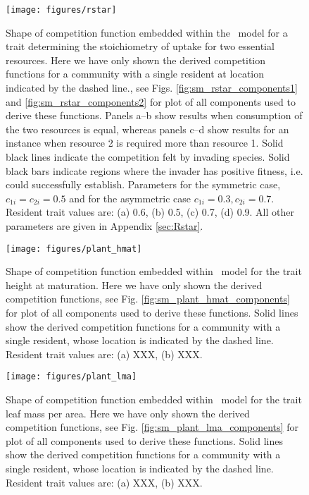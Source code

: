 \documentclass[a4paper,11pt]{article}
\begin{document}
\begin{figure}[h]
  \centering
  \texttt{[image: figures/rstar]}
  \caption{Shape of competition function embedded within the \Rstar\ model
  for a trait determining the stoichiometry of uptake for two essential resources.
  Here we have only shown the derived  competition functions for a
  community with a single resident at location indicated by the dashed line., see Figs.
  \ref{fig:sm_rstar_components1} and \ref{fig:sm_rstar_components2} for plot of all
  components used to derive these functions.
  Panels a--b show results when consumption of the two resources is equal, whereas
  panels c--d show results for an instance when resource 2 is required more than
  resource 1.
  Solid black lines indicate the competition felt by invading species. Solid
  black bars indicate regions where the invader has positive fitness, i.e.
  could successfully establish. Parameters for the symmetric case, $c_{1i} =
  c_ {2i}=0.5$ and for the asymmetric case $c_{1i} = 0.3, c_ {2i}=0.7$. Resident
  trait values are: (a) 0.6, (b) 0.5, (c) 0.7, (d) 0.9. All other parameters
  are given in Appendix \ref{sec:Rstar}.}
  \label{fig:Rstar}
\end{figure}

\begin{figure}[h]
  \centering
  \texttt{[image: figures/plant\_hmat]}
  \caption{Shape of competition function embedded within \plant\ model for
  the trait height at maturation.
  Here we have only shown the derived  competition functions, see Fig.
  \ref{fig:sm_plant_hmat_components} for plot of all components used to derive these functions.
  Solid lines show the derived competition functions for a community with a
  single resident, whose location is indicated by the dashed line.
  Resident trait values are: (a) XXX, (b) XXX.}
  \label{fig:plant_hmat}
\end{figure}

\begin{figure}[h]
  \centering
  \texttt{[image: figures/plant\_lma]}
  \caption{Shape of competition function embedded within \plant\ model for
  the trait leaf mass per area.
  Here we have only shown the derived  competition functions, see Fig.
  \ref{fig:sm_plant_lma_components} for plot of all components used to derive these functions.
  Solid lines show the derived competition functions for a community with a
  single resident, whose location is indicated by the dashed line.
  Resident trait values are: (a) XXX, (b) XXX.}
  \label{fig:plant_lma}
\end{figure}
\end{document}
